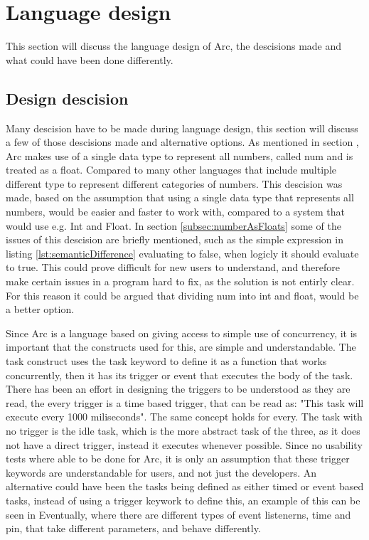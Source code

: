\section{Language design}

This section will discuss the language design of Arc, the descisions made and what could have been done differently.

\subsection{Design descision} 
Many descision have to be made during language design, this section will discuss a few of those descisions made and alternative options.
As mentioned in section , Arc makes use of a single data type to represent all numbers, called num and is treated as a float. Compared to many other languages that include multiple different type to represent different categories of numbers. This descision was made, based on the assumption that using a single data type that represents all numbers, would be easier and faster to work with, compared to a system that would use e.g. Int and Float. In section \ref{subsec:numberAsFloats} some of the issues of this descision are briefly mentioned, such as the simple expression in listing \ref{lst:semanticDifference} evaluating to false, when logicly it should evaluate to true. This could prove difficult for new users to understand, and therefore make certain issues in a program hard to fix, as the solution is not entirly clear. For this reason it could be argued that dividing num into int and float, would be a better option. 

Since Arc is a language based on giving access to simple use of concurrency, it is important that the constructs used for this, are simple and understandable. The task construct uses the task keyword to define it as a function that works concurrently, then it has its trigger or event that executes the body of the task. There has been an effort in designing the triggers to be understood as they are read, the every trigger is a time based trigger, that can be read as: "This task will execute every 1000 miliseconds". The same concept holds for every. The task with no trigger is the idle task, which is the more abstract task of the three, as it does not have a direct trigger, instead it executes whenever possible. Since no usability tests where able to be done for Arc, it is only an assumption that these trigger keywords are understandable for users, and not just the developers. An alternative could have been the tasks being defined as either timed or event based tasks, instead of using a trigger keywork to define this, an example of this can be seen in Eventually, where there are different types of event listenerns, time and pin, that take different parameters, and behave differently. 


